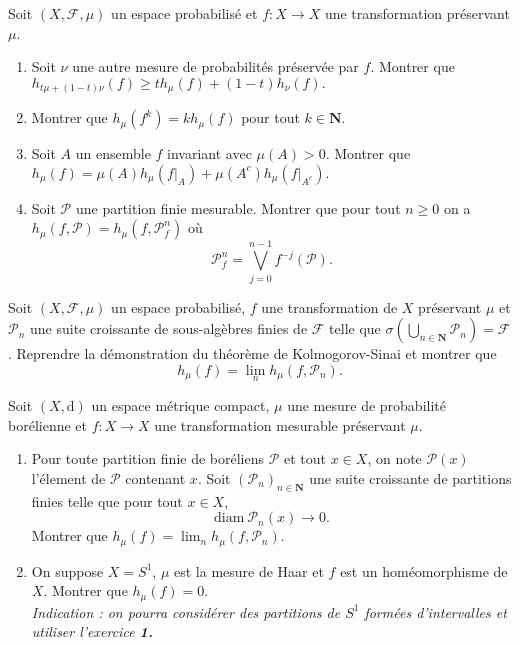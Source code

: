 \documentclass[a4paper,10pt,openany]{article}
\theoremstyle{plain}
\theoremstyle{definition}
\newcommand{\dd}{\mathrm{d}}
\newcommand{\N}{\mathbf{N}}
\newcommand{\Pcal}{\mathcal{P}}
\begin{document}
 \vspace{1.5mm} 

\noindent Soit $(X,\mathcal{F},\mu)$ un espace probabilis\'e et $f: X \to X$ une transformation pr\'eservant $\mu$.
\begin{enumerate}
\item Soit $\nu$ une autre mesure de probabilit\'es pr\'eserv\'ee par $f$. Montrer que
$
h_{t\mu + (1-t)\nu}(f) \geq th_{\mu}(f) + (1-t)h_\nu(f). 
$
\item Montrer que $h_\mu(f^k) = kh_\mu(f)$ pour tout $k \in \N$.
\item Soit $A$ un ensemble $f$ invariant avec $\mu(A) > 0$. Montrer que 
$h_\mu(f) = \mu(A) h_\mu(f|_A) + \mu(A^c) h_\mu(f|_{A^c}).$
\item Soit $\Pcal$ une partition finie mesurable. Montrer que pour tout $n \geqslant 0$ on a $h_\mu(f, \Pcal) = h_\mu(f, \Pcal^n_f)$ o\`u
$$
\Pcal^n_f = \bigvee_{j=0}^{n-1} f^{-j}(\Pcal).
$$
\end{enumerate}

\vspace{0.6cm}

 \vspace{1.5mm} 

\noindent Soit $(X, \mathcal{F}, \mu)$ un espace probabilis\'e, $f$ une transformation de $X$ pr\'eservant $\mu$ et $\mathcal{P}_n$ une suite croissante de sous-alg\`ebres finies de $\mathcal{F}$ telle que $\sigma\left(\bigcup_{n \in \N} \mathcal{P}_n\right) = \mathcal{F}$. Reprendre la d\'emonstration du th\'eor\`eme de Kolmogorov-Sinai et montrer que 
$$
h_\mu(f) = \lim_n h_\mu(f, \Pcal_n).
$$

\vspace{0.6cm}


 \vspace{1.5mm} 

\noindent Soit $(X, \dd)$ un espace m\'etrique compact, $\mu$ une mesure de probabilit\'e bor\'elienne et $f : X \to X$ une transformation mesurable pr\'eservant $\mu$.
\begin{enumerate}
\item Pour toute partition finie de bor\'eliens $\mathcal{P}$ et tout $x \in X$, on note $\mathcal{P}(x)$ l'\'element de $\mathcal{P}$ contenant $x$. Soit $(\mathcal{P}_n)_{n \in \N}$ une suite croissante de partitions finies telle que pour tout $x \in X$,
$$
\mathrm{diam}~ \mathcal{P}_n(x) \to 0.
$$
Montrer que $h_\mu(f) = \lim_n h_\mu(f, \mathcal{P}_n).$
\item On suppose $X = S^1$, $\mu$ est la mesure de Haar et $f$ est un hom\'eomorphisme de $X$. Montrer que $h_\mu(f) = 0$. \\
\textit{Indication : on pourra consid\'erer des partitions de $S^1$ form\'ees d'intervalles et utiliser l'exercice \textbf{1.}}
\end{enumerate}
\end{document}
